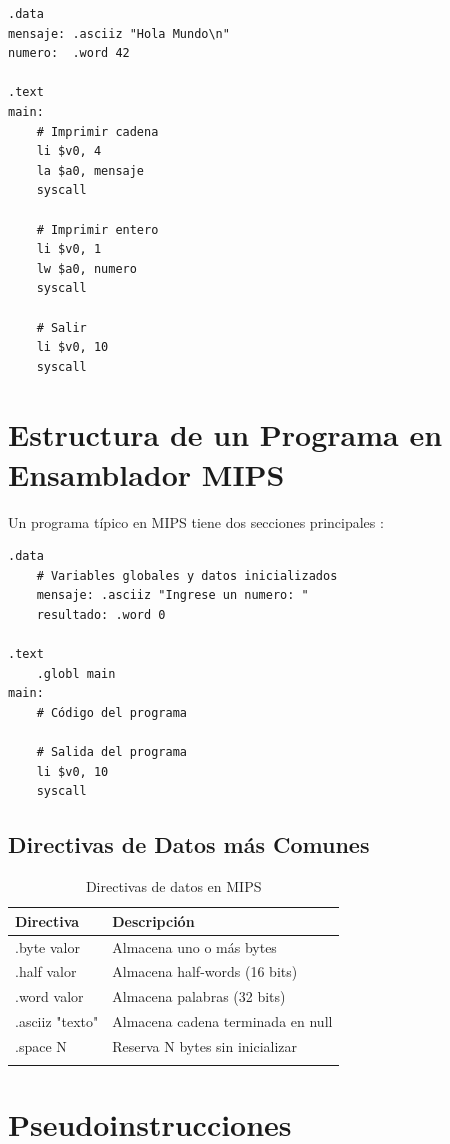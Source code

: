 \documentclass[12pt]{article}
\begin{document}
\begin{lstlisting}[caption=Ejemplo de programa completo con syscalls, label=lst:syscall]
.data
mensaje: .asciiz "Hola Mundo\n"
numero:  .word 42

.text
main:
    # Imprimir cadena
    li $v0, 4
    la $a0, mensaje
    syscall
    
    # Imprimir entero
    li $v0, 1
    lw $a0, numero
    syscall
    
    # Salir
    li $v0, 10
    syscall
\end{lstlisting}

\section{Estructura de un Programa en Ensamblador MIPS}

Un programa típico en MIPS tiene dos secciones principales \cite{mipsguide}:

\begin{lstlisting}[caption=Estructura básica de un programa MIPS, label=lst:estructura]
.data
    # Variables globales y datos inicializados
    mensaje: .asciiz "Ingrese un numero: "
    resultado: .word 0

.text
    .globl main
main:
    # Código del programa
    
    # Salida del programa
    li $v0, 10
    syscall
\end{lstlisting}

\subsection{Directivas de Datos más Comunes}

\begin{longtable}{|l|l|}
    \hline
    \textbf{Directiva} & \textbf{Descripción} \\
    \hline
    .byte valor & Almacena uno o más bytes \\
    \hline
    .half valor & Almacena half-words (16 bits) \\
    \hline
    .word valor & Almacena palabras (32 bits) \\
    \hline
    .asciiz "texto" & Almacena cadena terminada en null \\
    \hline
    .space N & Reserva N bytes sin inicializar \\
    \hline
    \caption{Directivas de datos en MIPS}
\end{longtable}

\section{Pseudoinstrucciones}
\end{document}
